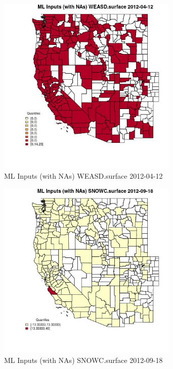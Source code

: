 \clearpage 

\begin{figure} 
\centering  
\includegraphics[width=0.77\textwidth]{Code_Outputs/Report_ML_input_PM25_Step4_part_e_de_duplicated_aves_compiled_2019-05-14wNAs_CountyWEASDsurfaceMean2012-04-12_2012-04-12.jpg} 
\caption{\label{fig:Report_ML_input_PM25_Step4_part_e_de_duplicated_aves_compiled_2019-05-14wNAsCountyWEASDsurfaceMean2012-04-12_2012-04-12}ML Inputs (with NAs) WEASD.surface 2012-04-12} 
\end{figure} 
 

\begin{figure} 
\centering  
\includegraphics[width=0.77\textwidth]{Code_Outputs/Report_ML_input_PM25_Step4_part_e_de_duplicated_aves_compiled_2019-05-14wNAs_CountySNOWCsurfaceMean2012-09-18_2012-09-18.jpg} 
\caption{\label{fig:Report_ML_input_PM25_Step4_part_e_de_duplicated_aves_compiled_2019-05-14wNAsCountySNOWCsurfaceMean2012-09-18_2012-09-18}ML Inputs (with NAs) SNOWC.surface 2012-09-18} 
\end{figure} 
 


